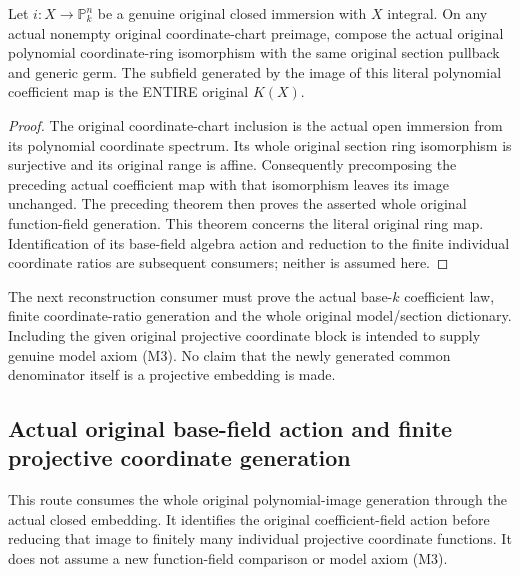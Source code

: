 \begin{theorem}
\label{thm:seven-original-projective-coordinate-field-generation-route}
\leanok
{}
Let $i:X\to\mathbb P^n_k$ be a genuine original closed immersion with
$X$ integral. On any actual nonempty original coordinate-chart preimage,
compose the actual original polynomial coordinate-ring isomorphism
with the same original section pullback and generic germ. The subfield
generated by the image of this literal polynomial coefficient map is
the ENTIRE original $K(X)$.
\end{theorem}
\begin{proof}
The original coordinate-chart inclusion is the actual open immersion
from its polynomial coordinate spectrum. Its whole original section
ring isomorphism is surjective and its original range is affine.
Consequently precomposing the preceding actual coefficient map with
that isomorphism leaves its image unchanged. The preceding theorem
then proves the asserted whole original function-field generation.
This theorem concerns the literal original ring map. Identification
of its base-field algebra action and reduction to the finite individual
coordinate ratios are subsequent consumers; neither is assumed here.
\end{proof}

The next reconstruction consumer must prove the actual base-$k$
coefficient law, finite coordinate-ratio generation and the whole
original model/section dictionary. Including the given original
projective coordinate block is intended to supply genuine model axiom
(M3). No claim that the newly generated common denominator itself is a
projective embedding is made.
\subsection{Actual original base-field action and finite projective coordinate generation}
This route consumes the whole original polynomial-image generation
through the actual closed embedding. It identifies the original
coefficient-field action before reducing that image to finitely many
individual projective coordinate functions. It does not assume a new
function-field comparison or model axiom (M3).


